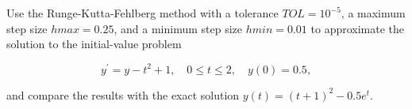 %
%
%
%
%
%
\begin{example}
Use the Runge-Kutta-Fehlberg method with a tolerance $T O L=10^{-5}$, a maximum step size $h m a x=0.25$, and a minimum step size $h m i n=0.01$ to approximate the solution to the initial-value problem

$$
y^{\prime}=y-t^{2}+1, \quad 0 \leq t \leq 2, \quad y(0)=0.5,
$$

and compare the results with the exact solution $y(t)=(t+1)^{2}-0.5 e^{t}$.
\end{example}

